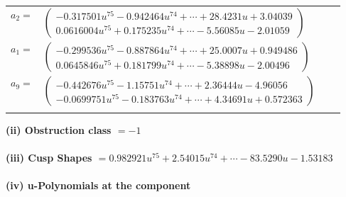 \documentclass[1p]{elsarticle_modified}
\theoremstyle{definition}
\begin{document}
\begin{tabular}{m{7pt} m{180pt} m{7pt} m{180pt} }
\flushright $a_{2}=$&$\begin{pmatrix}-0.317501 u^{75}-0.942464 u^{74}+\cdots+28.4231 u+3.04039\\0.0616004 u^{75}+0.175235 u^{74}+\cdots-5.56085 u-2.01059\end{pmatrix}$ \\
\flushright $a_{1}=$&$\begin{pmatrix}-0.299536 u^{75}-0.887864 u^{74}+\cdots+25.0007 u+0.949486\\0.0645846 u^{75}+0.181799 u^{74}+\cdots-5.38898 u-2.00496\end{pmatrix}$ \\
\flushright $a_{9}=$&$\begin{pmatrix}-0.442676 u^{75}-1.15751 u^{74}+\cdots+2.36444 u-4.96056\\-0.0699751 u^{75}-0.183763 u^{74}+\cdots+4.34691 u+0.572363\end{pmatrix}$\\&\end{tabular}
\flushleft \textbf{(ii) Obstruction class $= -1$}\\~\\
\flushleft \textbf{(iii) Cusp Shapes $= 0.982921 u^{75}+2.54015 u^{74}+\cdots-83.5290 u-1.53183$}\\~\\
\newpage\renewcommand{\arraystretch}{1}
\flushleft \textbf{(iv) u-Polynomials at the component}\newline \\
\end{document}
